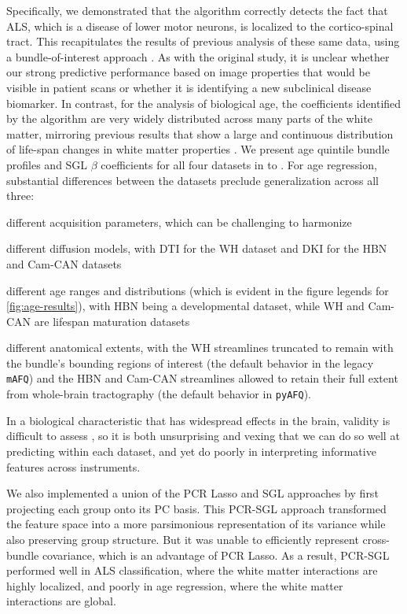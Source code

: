 \documentclass[10pt,letterpaper]{article}
\begin{document}
Specifically, we demonstrated that the algorithm correctly detects the fact
that ALS, which is a disease of lower motor neurons, is localized to the
cortico-spinal tract. This recapitulates the results of previous analysis of
these same data, using a bundle-of-interest approach
\cite{sarica2017corticospinal}.
As with the original study, it is unclear whether our strong predictive performance based on image properties that would be visible in patient scans or whether it is identifying a new subclinical disease biomarker.
In contrast, for the analysis of biological
age, the coefficients identified by the algorithm are very widely distributed
across many parts of the white matter, mirroring previous results that show a
large and continuous distribution of life-span changes in white matter
properties \cite{yeatman2014lifespan}.
We present age quintile bundle profiles and SGL \protect$\beta$ coefficients for all four datasets in  to . For age regression, substantial differences between the datasets preclude generalization across all three:
\begin{enumerate*}[%
    label=(\roman*),%
    before=\unskip{: },%
    itemjoin={{, }},%
    itemjoin*={{, and }}]
    \item different acquisition parameters, which can be challenging to harmonize \cite{pinto2020harmonization}
    \item different diffusion models, with DTI for the WH dataset and DKI for the HBN and Cam-CAN datasets
    \item different age ranges and distributions (which is evident in the figure legends for \cref{fig:age-results}), with HBN being a developmental dataset, while WH and Cam-CAN are lifespan maturation datasets
    \item different anatomical extents, with the WH streamlines truncated to remain with the bundle's bounding regions of interest (the default behavior in the legacy \texttt{mAFQ}) and the HBN and Cam-CAN streamlines allowed to retain their full extent from whole-brain tractography (the default behavior in \texttt{pyAFQ}).
\end{enumerate*}
In a biological characteristic that has widespread effects in the brain, validity is difficult to assess \cite{lermausabiaga2019replication}, so it is both unsurprising and vexing that we can do so well at predicting within each dataset, and yet do poorly in interpreting informative features across instruments.


We also implemented a union of the PCR Lasso and SGL approaches by first
projecting each group onto its PC basis. This PCR-SGL approach transformed the feature
space into a more parsimonious representation of its variance while
also preserving group structure. But it was unable to efficiently represent
cross-bundle covariance, which is an advantage of PCR Lasso. As a result, PCR-SGL performed well in ALS classification,
where the white matter interactions are highly localized, and poorly
in age regression, where the white matter interactions are global.
\end{document}
